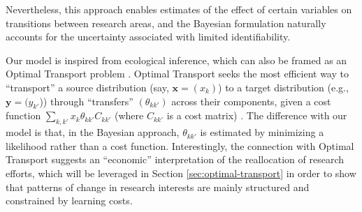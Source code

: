 \documentclass{article}
\begin{document}
Nevertheless, this approach enables estimates of the effect of certain variables on transitions between research areas, and the Bayesian formulation naturally accounts for the uncertainty associated with limited identifiability.

Our model is inspired from ecological inference, which can also be framed as an Optimal Transport problem \citep{muzellec2017tsallis,li2019learning}. Optimal Transport seeks the most efficient way to  ``transport'' a source distribution (say, $\bm{x}=(x_k)$) to a target distribution (e.g., $\bm{y}=(y_{k'}$)) through ``transfers'' $(\theta_{kk'})$ across their components, given a cost function $\sum_{k,k'} x_{k} \theta_{kk'}C_{kk'}$ (where $C_{kk'}$ is a cost matrix) \citep{Peyre2018}. The difference with our model is that, in the Bayesian approach, $\theta_{kk'}$ is estimated by minimizing a likelihood rather than a cost function. Interestingly, the connection with Optimal Transport suggests an ``economic'' interpretation of the reallocation of research efforts, which will be leveraged in Section \ref{sec:optimal-transport} in order to show that patterns of change in research interests are mainly structured and constrained by learning costs. %


\end{document}
